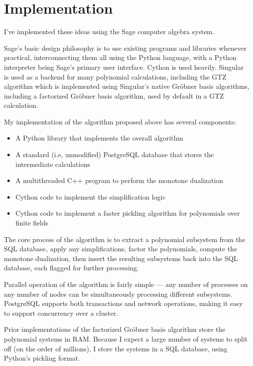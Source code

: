 \documentclass{article}
\begin{document}
\section*{Implementation}

I've implemented these ideas using the Sage computer algebra system.

Sage's basic design philosophy is to use existing programs and libraries
whenever practical, interconnecting them all using the Python language,
with a Python interpreter being Sage's primary user interface.
Cython is used heavily.
Singular is used as a backend for many polynomial calculations,
including the GTZ algorithm which is implemented using Singular's
native Gr\"obner basis algorithms, including a factorized
Gr\"obner basis algorithm, used by default in a GTZ calculation.


My implementation of the algorithm proposed above has several components:

\begin{itemize}
\item A Python library that implements the overall algorithm
\item A standard (i.e, unmodified) PostgreSQL database that stores the intermediate calculations
\item A multithreaded C++ program to perform the monotone dualization
\item Cython code to implement the simplification logic
\item Cython code to implement a faster pickling algorithm for polynomials over finite fields
\end{itemize}

The core process of the algorithm is to extract a polynomial subsystem from the SQL database,
apply any simplifications, factor the polynomials, compute the monotone dualization,
then insert the resulting subsystems back into the SQL database, each flagged for further processing.

Parallel operation of the algorithm is fairly simple --- any number of processes on any
number of nodes can be simultaneously processing different subsystems.  PostgreSQL
supports both transactions and network operations, making it easy to support concurrency
over a cluster.

Prior implementations of the factorized Gr\"obner basis algorithm
store the polynomial systems in RAM.  Because I expect a large number
of systems to split off (on the order of millions), I store the
systems in a SQL database, using Python's pickling format.
\end{document}
